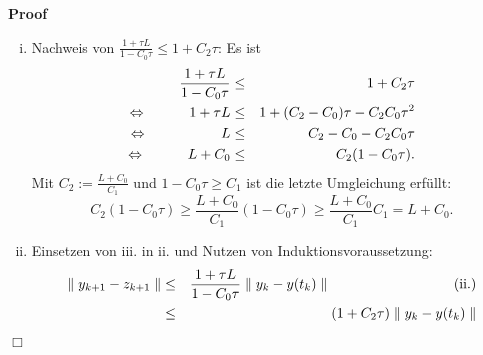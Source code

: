 \documentclass{book}
\newcommand{\assign}{:=}
\newenvironment{enumerateroman}{\begin{enumerate}[i.] }{\end{enumerate}}
\newenvironment{itemizedot}{\begin{itemize} \renewcommand{\labelitemi}{$\bullet$}\renewcommand{\labelitemii}{$\bullet$}\renewcommand{\labelitemiii}{$\bullet$}\renewcommand{\labelitemiv}{$\bullet$}}{\end{itemize}}
\newenvironment{proof}{\noindent\textbf{Proof\ }}{\hspace*{\fill}$\Box$\medskip}
\begin{document}
\begin{proof}
\begin{itemizedot}
\begin{enumerateroman}
      Somit gilt
      \begin{eqnarray*}
        &  & \parallel y_{k + 1} - z_{k + 1} \parallel\\
        & = & \parallel y_k - y (t_k) + \tau_k (\phi_k (y_k, y_{k + 1}) -
        \phi_k (y (t_k), z_{k + 1})) \parallel\\
        & \leq & \parallel y_k - y (t_k) \parallel + | \tau_k | \parallel
        \tau_k (\phi_k (y_k, y_{k + 1}) - \phi_k (y (t_k), z_{k + 1}))
        \parallel\\
        & \leq & \parallel y_k - y (t_k) \parallel + | \tau_k | (L \parallel
        y_k - y (t_k) \parallel + C_0 \parallel y_{k + 1} - z_{k + 1}
        \parallel)
      \end{eqnarray*}
      und mit Umformung erhalten wir
      \[ \parallel y_{k + 1} - z_{k + 1} \parallel \leq \frac{1 + \tau L}{1 -
         C_0 \tau} \parallel y_k - y (t_k) \parallel . \]
      \item Nachweis von $\frac{1 + \tau L}{1 - C_0 \tau} \leq 1 + C_2 \tau$:
      {\hspace{18em}} Es ist
      \begin{eqnarray*}
        \frac{1 + \tau L}{1 - C_0 \tau} & \leq & 1 + C_2 \tau\\
        \Leftrightarrow \text{{\hspace{3em}}} 1 + \tau L & \leq & 1 + (C_2 -
        C_0) \tau - C_2 C_0 \tau^2\\
        \Leftrightarrow \text{{\hspace{3em}}} \hspace{2.2em} L & \leq & C_2 -
        C_0 - C_2 C_0 \tau\\
        \Leftrightarrow \text{{\hspace{3em}}} L + C_0 & \leq & C_2 (1 - C_0
        \tau) .
      \end{eqnarray*}
      Mit $C_2 \assign \frac{L + C_0}{C_1}$ und $1 - C_0 \tau \geq C_1$ ist
      die letzte Umgleichung erf{\"u}llt:
      \[ C_2 (1 - C_0 \tau) \geq \frac{L + C_0}{C_1} (1 - C_0 \tau) \geq
         \frac{L + C_0}{C_1} C_1 = L + C_0 . \]
      \item Einsetzen von iii. in ii. und Nutzen von Induktionsvoraussetzung:
      \begin{eqnarray*}
        \parallel y_{k + 1} - z_{k + 1} \parallel & \leq & \frac{1 + \tau L}{1
        - C_0 \tau} \parallel y_k - y (t_k) \parallel
        \text{{\hspace{8.8em}}(ii.)}\\
        & \leq & (1 + C_2 \tau) \parallel y_k - y (t_k) \parallel

\end{eqnarray*}
\end{enumerateroman}
\end{itemizedot}
\end{proof}
\end{document}
